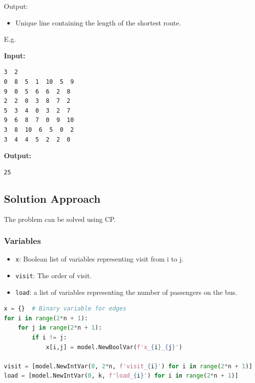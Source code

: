 \documentclass{article}
\begin{document}
Output:
\begin{itemize}
    \item Unique line containing the length of the shortest route.
\end{itemize}

E.g.
\begin{multicols}{2}
\textbf{Input:}
\begin{verbatim}
3  2
0  8  5  1  10  5  9
9  0  5  6  6  2  8
2  2  0  3  8  7  2
5  3  4  0  3  2  7
9  6  8  7  0  9  10
3  8  10  6  5  0  2
3  4  4  5  2  2  0
\end{verbatim}
\columnbreak
\textbf{Output:}
\begin{verbatim}
25
\end{verbatim}
\end{multicols}

\subsection{Solution Approach}
The problem can be solved using CP.
\subsubsection{Variables}
\begin{itemize}
    \item \verb|x|: Boolean list of variables representing visit from i to j.
    \item \verb|visit|: The order of visit.
    \item \verb|load|: a list of variables representing the number of passengers on the bus.
\end{itemize}
\pagebreak
\begin{lstlisting}[language=Python]
x = {}  # Binary variable for edges
for i in range(2*n + 1):
    for j in range(2*n + 1):
        if i != j:
            x[i,j] = model.NewBoolVar(f'x_{i}_{j}')

visit = [model.NewIntVar(0, 2*n, f'visit_{i}') for i in range(2*n + 1)]
load = [model.NewIntVar(0, k, f'load_{i}') for i in range(2*n + 1)]
\end{lstlisting}
\end{document}
